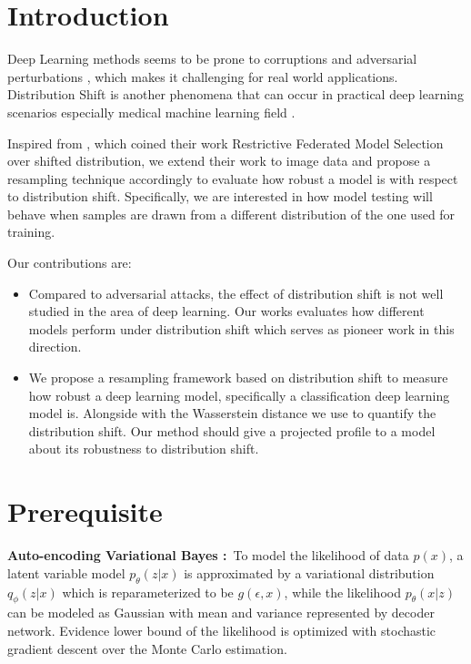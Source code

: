 \documentclass{article}
\begin{document}
\section{Introduction}
\label{intro}
Deep Learning methods seems to be prone to corruptions and adversarial perturbations \cite{carlini2017towards}, which makes it challenging for real world applications. Distribution Shift \cite{wen2014robust} is another phenomena that can occur in practical deep learning scenarios especially medical machine learning field \cite{sun2019high}. 

Inspired from \cite{sun2019high}, which coined their work Restrictive Federated Model Selection over shifted distribution, we extend their work to image data and propose a resampling technique accordingly to evaluate how robust a model is with respect to distribution shift.
Specifically, we are interested in how model testing will behave when samples are drawn from a different distribution of the one used for training.

Our contributions are:

\begin{itemize}
\item Compared to adversarial attacks, the effect of distribution shift is not well studied in the area of deep learning. Our works evaluates how different models perform under distribution shift which serves as pioneer work in this direction.
\item We propose a resampling framework based on distribution shift to measure how robust a deep learning model, specifically a classification deep learning model is. Alongside with the Wasserstein distance we use to quantify the distribution shift. Our method should give a projected profile to a model about its robustness to distribution shift.
\end{itemize}

\section{Prerequisite}
\textbf{Auto-encoding Variational Bayes \cite{FIXME}:}\, To model the likelihood of data $p(x)$, a latent variable model $p_{\theta}(z|x)$ is approximated by a variational distribution $q_{\phi}(z|x)$ which is reparameterized to be $g(\epsilon, x)$, while the likelihood $p_{\theta}(x|z)$ can be modeled as Gaussian with mean and variance represented by decoder network. Evidence lower bound of the likelihood is optimized with stochastic gradient descent over the Monte Carlo estimation.
\end{document}
